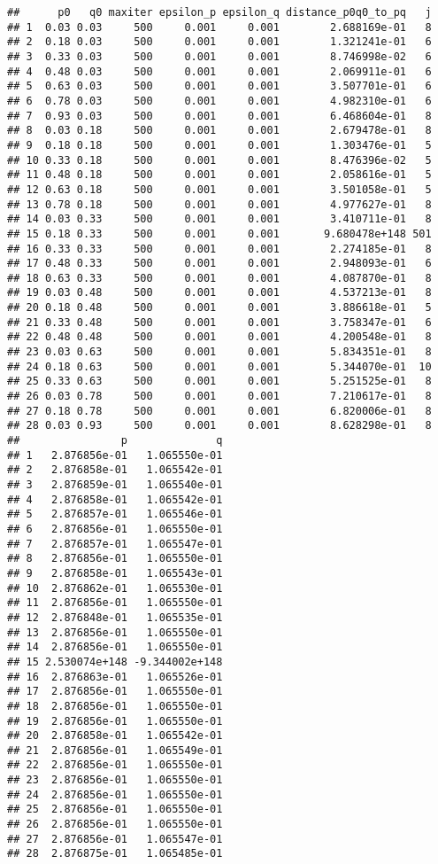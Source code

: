 \documentclass[]{article}
\begin{document}
\begin{verbatim}
##      p0   q0 maxiter epsilon_p epsilon_q distance_p0q0_to_pq   j
## 1  0.03 0.03     500     0.001     0.001        2.688169e-01   8
## 2  0.18 0.03     500     0.001     0.001        1.321241e-01   6
## 3  0.33 0.03     500     0.001     0.001        8.746998e-02   6
## 4  0.48 0.03     500     0.001     0.001        2.069911e-01   6
## 5  0.63 0.03     500     0.001     0.001        3.507701e-01   6
## 6  0.78 0.03     500     0.001     0.001        4.982310e-01   6
## 7  0.93 0.03     500     0.001     0.001        6.468604e-01   8
## 8  0.03 0.18     500     0.001     0.001        2.679478e-01   8
## 9  0.18 0.18     500     0.001     0.001        1.303476e-01   5
## 10 0.33 0.18     500     0.001     0.001        8.476396e-02   5
## 11 0.48 0.18     500     0.001     0.001        2.058616e-01   5
## 12 0.63 0.18     500     0.001     0.001        3.501058e-01   5
## 13 0.78 0.18     500     0.001     0.001        4.977627e-01   8
## 14 0.03 0.33     500     0.001     0.001        3.410711e-01   8
## 15 0.18 0.33     500     0.001     0.001       9.680478e+148 501
## 16 0.33 0.33     500     0.001     0.001        2.274185e-01   8
## 17 0.48 0.33     500     0.001     0.001        2.948093e-01   6
## 18 0.63 0.33     500     0.001     0.001        4.087870e-01   8
## 19 0.03 0.48     500     0.001     0.001        4.537213e-01   8
## 20 0.18 0.48     500     0.001     0.001        3.886618e-01   5
## 21 0.33 0.48     500     0.001     0.001        3.758347e-01   6
## 22 0.48 0.48     500     0.001     0.001        4.200548e-01   8
## 23 0.03 0.63     500     0.001     0.001        5.834351e-01   8
## 24 0.18 0.63     500     0.001     0.001        5.344070e-01  10
## 25 0.33 0.63     500     0.001     0.001        5.251525e-01   8
## 26 0.03 0.78     500     0.001     0.001        7.210617e-01   8
## 27 0.18 0.78     500     0.001     0.001        6.820006e-01   8
## 28 0.03 0.93     500     0.001     0.001        8.628298e-01   8
##                p              q
## 1   2.876856e-01   1.065550e-01
## 2   2.876858e-01   1.065542e-01
## 3   2.876859e-01   1.065540e-01
## 4   2.876858e-01   1.065542e-01
## 5   2.876857e-01   1.065546e-01
## 6   2.876856e-01   1.065550e-01
## 7   2.876857e-01   1.065547e-01
## 8   2.876856e-01   1.065550e-01
## 9   2.876858e-01   1.065543e-01
## 10  2.876862e-01   1.065530e-01
## 11  2.876856e-01   1.065550e-01
## 12  2.876848e-01   1.065535e-01
## 13  2.876856e-01   1.065550e-01
## 14  2.876856e-01   1.065550e-01
## 15 2.530074e+148 -9.344002e+148
## 16  2.876863e-01   1.065526e-01
## 17  2.876856e-01   1.065550e-01
## 18  2.876856e-01   1.065550e-01
## 19  2.876856e-01   1.065550e-01
## 20  2.876858e-01   1.065542e-01
## 21  2.876856e-01   1.065549e-01
## 22  2.876856e-01   1.065550e-01
## 23  2.876856e-01   1.065550e-01
## 24  2.876856e-01   1.065550e-01
## 25  2.876856e-01   1.065550e-01
## 26  2.876856e-01   1.065550e-01
## 27  2.876856e-01   1.065547e-01
## 28  2.876875e-01   1.065485e-01
\end{verbatim}
\end{document}
